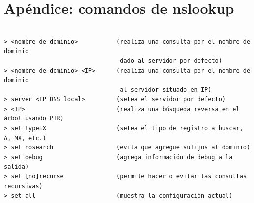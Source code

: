 \documentclass[a4paper,10pt]{article}
\begin{document}
\section*{Apéndice: comandos de nslookup}


\begin{verbatim}

> <nombre de dominio>           (realiza una consulta por el nombre de dominio
                                 dado al servidor por defecto)
> <nombre de dominio> <IP>      (realiza una consulta por el nombre de dominio 
                                 al servidor situado en IP)
> server <IP DNS local>         (setea el servidor por defecto)
> <IP>                          (realiza una búsqueda reversa en el árbol usando PTR)
> set type=X                    (setea el tipo de registro a buscar, A, MX, etc.)
> set nosearch                  (evita que agregue sufijos al dominio)
> set debug                     (agrega información de debug a la salida)
> set [no]recurse               (permite hacer o evitar las consultas recursivas)
> set all                       (muestra la configuración actual)
\end{verbatim}
\end{document}
